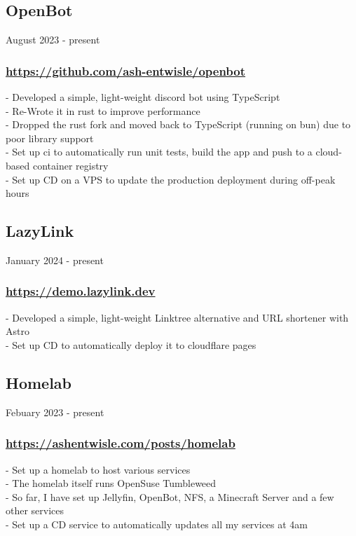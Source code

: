 \subsection{OpenBot} August 2023 - present \\
\subsubsection{\href{https://github.com/ash-entwisle/openbot}{https://github.com/ash-entwisle/openbot}}
-\:  Developed a simple, light-weight discord bot using TypeScript \\
-\:  Re-Wrote it in rust to improve performance \\
-\:  Dropped the rust fork and moved back    to TypeScript (running on bun) due to poor library support \\
-\:  Set up ci to automatically run unit tests, build the app and push to a cloud-based container registry \\
-\:  Set up CD on a VPS to update the production deployment during off-peak hours \\

\subsection{LazyLink} January 2024 - present \\
\subsubsection{\href{https://demo.lazylink.dev}{https://demo.lazylink.dev}}
-\: Developed a simple, light-weight Linktree alternative and URL shortener with Astro \\
-\: Set up CD to automatically deploy it to cloudflare pages \\

\subsection{Homelab} Febuary 2023 - present \\
\subsubsection{\href{https://ashentwisle.com/posts/homelab-go-brrr}{https://ashentwisle.com/posts/homelab}}
-\:  Set up a homelab to host various services \\
-\:  The homelab itself runs OpenSuse Tumbleweed \\
-\:  So far, I have set up Jellyfin, OpenBot, NFS, a Minecraft Server and a few other services \\
-\:  Set up a CD service to automatically updates all my services at 4am \\
